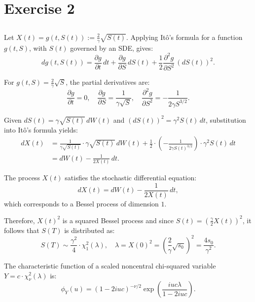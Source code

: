 \section{Exercise 2}

\subsection{}
Let $X(t) = g(t, S(t)) := \frac{2}{\gamma} \sqrt{S(t)}$. Applying Itô's formula for a function $g(t, S)$, with $S(t)$ governed by an SDE, gives:
\begin{equation*}
    dg(t, S(t)) = \frac{\partial g}{\partial t} \, dt + \frac{\partial g}{\partial S} \, dS(t) + \frac{1}{2} \frac{\partial^2 g}{\partial S^2} \, (dS(t))^2.
\end{equation*}

For $g(t, S) = \frac{2}{\gamma} \sqrt{S}$, the partial derivatives are:
\begin{equation*}
    \frac{\partial g}{\partial t} = 0, \quad \frac{\partial g}{\partial S} = \frac{1}{\gamma \sqrt{S}}, \quad \frac{\partial^2 g}{\partial S^2} = -\frac{1}{2 \gamma S^{3/2}}.
\end{equation*}

Given $dS(t) = \gamma \sqrt{S(t)} \, dW(t)$ and $(dS(t))^2 = \gamma^2 S(t) \, dt$, substitution into Itô's formula yields:
\begin{align*}
    dX(t) &= \frac{1}{\gamma \sqrt{S(t)}} \cdot \gamma \sqrt{S(t)} \, dW(t)
           + \frac{1}{2} \cdot \left(-\frac{1}{2 \gamma S(t)^{3/2}}\right) \cdot \gamma^2 S(t) \, dt \\
          &= dW(t) - \frac{1}{2 X(t)} \, dt.
\end{align*}

The process $X(t)$ satisfies the stochastic differential equation:
\begin{equation*}
    dX(t) = dW(t) - \frac{1}{2 X(t)} \, dt,
\end{equation*}
which corresponds to a Bessel process of dimension $1$.

Therefore, $X(t)^2$ is a squared Bessel process and since $S(t) = \left( \frac{\gamma}{2} X(t) \right)^2$, it follows that $S(T)$ is distributed as:
\begin{equation*}
    S(T) \sim \frac{\gamma^2}{4} \cdot \chi^2_1(\lambda), \quad \lambda = X(0)^2 = \left( \frac{2}{\gamma} \sqrt{s_0} \right)^2 = \frac{4 s_0}{\gamma^2}.
\end{equation*}

The characteristic function of a scaled noncentral chi-squared variable $Y = c \cdot \chi^2_\nu(\lambda)$ is:
\begin{equation*}
    \phi_Y(u) = (1 - 2iuc)^{-\nu/2} \exp\left( \frac{iuc\lambda}{1 - 2iuc} \right).
\end{equation*}


